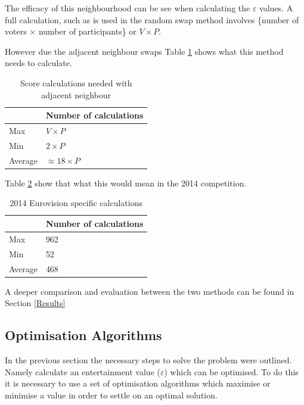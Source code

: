 \documentclass[12pt]{report}
\begin{document}
The efficacy of this neighbourhood can be see when calculating the $\varepsilon$ values. A full calculation, such as is used in the random swap method involves \{number of voters $\times$ number of participants\} or $V \times P$. 

However due the adjacent neighbour swaps Table \ref{scoreCalcsAdj} shows what this method needs to calculate.

\begin{table}[H]
\centering
\caption{Score calculations needed with adjacent neighbour}
\label{scoreCalcsAdj}
\begin{tabular}{|l|l|}
\hline
        & Number of calculations \\ \hline
Max     & $V \times P$           \\ \hline
Min     & $2 \times P$           \\ \hline
Average & $\approx 18 \times P$          \\ \hline
\end{tabular}
\end{table}

Table \ref{scoreCalcsAdj2014} show that what this would mean in the 2014 competition.
\begin{table}[H]
\centering
\caption{2014 Eurovision specific calculations}
\label{scoreCalcsAdj2014}
\begin{tabular}{|l|l|}
\hline
        & Number of calculations \\ \hline
Max     & 962                    \\ \hline
Min     & 52                     \\ \hline
Average & 468                    \\ \hline
\end{tabular}
\end{table}

A deeper comparison and evaluation between the two methods can be found in Section \ref{Results}

\subsection{Optimisation Algorithms}\label{Algorithms}
In the previous section the necessary steps to solve the problem were outlined. Namely calculate an entertainment value ($\varepsilon$) which can be optimised. To do this it is necessary to use a set of optimisation algorithms which maximise or minimise a value in order to settle on an optimal solution.
\end{document}
